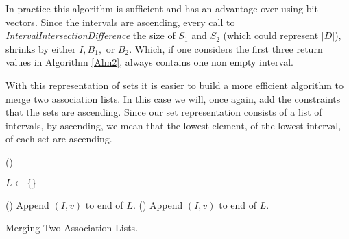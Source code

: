 \documentclass{article}
\begin{document}
In practice this algorithm is sufficient and has an advantage
over using bit-vectors.
Since the intervals are ascending,
every call to
\emph{IntervalIntersectionDifference}
the size of $S_{1}$ and $S_{2}$ (which could represent $|D|$),
shrinks by either $I,B_{1},$ or $B_{2}$.
Which, if one considers the first three return
values in Algorithm \ref{Alm2},
always contains one non empty interval.

With this representation of sets it is easier to build a more efficient
algorithm to merge two association lists.
In this case we will,
once again,
add the constraints that the sets are ascending.
Since our set representation consists of a list of intervals,
by ascending,
we mean that the lowest element, of the lowest interval,
of each set
are ascending.

\begin{algorithm}[H]
  \newcommand{\forcond}{$i=0$ \KwTo $n$}
  \DontPrintSemicolon
  \Fn(){}{
    $L \leftarrow \{\} $\;

  }
  \Fn(){}{
    Append $(I,v)$ to end of $L$.\;
  }
  \Fn(){}{
    Append $(I,v)$ to end of $L$.\;
  }

\caption{Merging Two Association Lists.\label{Alm4}}
\end{algorithm}
\end{document}
